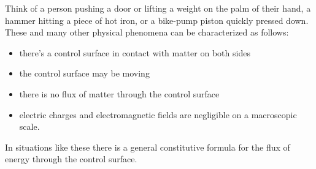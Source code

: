 \documentclass[a4paper,12pt,%
onecolumn,oneside,titlepage,%
british%
]{memoir}
\renewcommand*{\|}[1][]{\nonscript\:#1\vert\nonscript\:\mathopen{}}
\begin{document}
%
%
Think of a person pushing a door or lifting a weight on the palm of their hand, a hammer hitting a piece of hot iron, or a bike-pump piston quickly pressed down. These and many other physical phenomena can be characterized as follows:
\begin{itemize}[nosep]
\item there's a control surface in contact with matter on both sides
\item the control surface may be moving
\item there is no flux of matter through the control surface
\item electric charges and electromagnetic fields are negligible on a macroscopic scale.
\end{itemize}
In situations like these there is a general constitutive formula for the flux of energy through the control surface.
\end{document}
